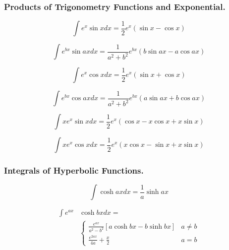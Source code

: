 \documentclass[../main.tex]{subfiles}
\begin{document}
\subsubsection*{Products of Trigonometry Functions and Exponential.}
    
\begin{equation*}
    \int e^x \sin x dx = \frac{1}{2}e^x (\sin x - \cos x) 
    \end{equation*}
    
    \begin{equation*}
    \int e^{bx} \sin ax dx = \frac{1}{a^2+b^2}e^{bx} (b\sin ax - a\cos ax) 
    \end{equation*}
    
    \begin{equation*}
    \int e^x \cos x dx = \frac{1}{2}e^x (\sin x + \cos x)  
    \end{equation*}
    
    \begin{equation*}
    \int e^{bx} \cos ax dx = \frac{1}{a^2 + b^2} e^{bx} ( a \sin ax + b \cos ax ) 
    \end{equation*}
    
    \begin{equation*}
    \int x e^x \sin x dx = \frac{1}{2}e^x (\cos x - x \cos x + x \sin x) 
    \end{equation*}
    
    \begin{equation*}
    \int x e^x \cos x dx = \frac{1}{2}e^x (x \cos x 
    - \sin x + x \sin x) 
    \end{equation*}


\subsubsection*{Integrals of Hyperbolic Functions.}
    
\begin{equation*}
    \int \cosh ax dx =\frac{1}{a} \sinh ax 
    \end{equation*}
    
    \begin{align*}
    \int e^{ax} & \cosh bx dx = \nonumber \\ &
    \begin{cases}
    \displaystyle{\frac{e^{ax}}{a^2-b^2} }[ a \cosh bx - b \sinh bx ]  & a\ne b \\
    \displaystyle{\frac{e^{2ax}}{4a} + \frac{x}{2}}  & a = b
    \end{cases}
    \end{align*}
    
\end{document}
